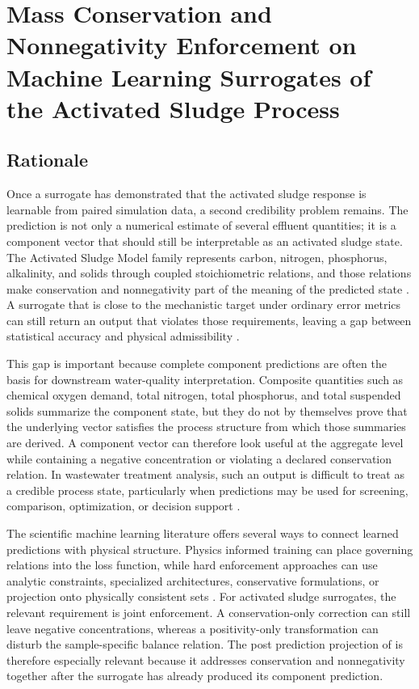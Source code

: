 \documentclass[12pt, twoside]{book}
\begin{document}
\chapter{Mass Conservation and Nonnegativity Enforcement on Machine Learning Surrogates of the Activated Sludge Process}
\label{ch:conservation}

\section{Rationale}

Once a surrogate has demonstrated that the activated sludge response is learnable from paired simulation data,
a second credibility problem remains. The prediction is not only a numerical estimate of several effluent
quantities; it is a component vector that should still be interpretable as an activated sludge state. The
Activated Sludge Model family represents carbon, nitrogen, phosphorus, alkalinity, and solids through coupled
stoichiometric relations, and those relations make conservation and nonnegativity part of the meaning of the
predicted state \citep{Henze2006,Guerrero2011}. A surrogate that is close to the mechanistic target under
ordinary error metrics can still return an output that violates those requirements, leaving a gap between
statistical accuracy and physical admissibility \citep{Hansen2024,KircherVotsmeier2025}.

This gap is important because complete component predictions are often the basis for downstream water-quality
interpretation. Composite quantities such as chemical oxygen demand, total nitrogen, total phosphorus, and
total suspended solids summarize the component state, but they do not by themselves prove that the underlying
vector satisfies the process structure from which those summaries are derived. A component vector can therefore
look useful at the aggregate level while containing a negative concentration or violating a declared
conservation relation. In wastewater treatment analysis, such an output is difficult to treat as a credible
process state, particularly when predictions may be used for screening, comparison, optimization, or decision
support \citep{Araujo2013,BhosekarIerapetritou2018,Durkin2024,Mao2024}.

The scientific machine learning literature offers several ways to connect learned predictions with physical
structure. Physics informed training can place governing relations into the loss function, while hard
enforcement approaches can use analytic constraints, specialized architectures, conservative formulations, or
projection onto physically consistent sets \citep{Raissi2019,Beucler2021,Hansen2024,SturmWexler2020,SturmWexler2022,Valente2025}.
For activated sludge surrogates, the relevant requirement is joint enforcement. A conservation-only correction
can still leave negative concentrations, whereas a positivity-only transformation can disturb the
sample-specific balance relation. The post prediction projection of \citet{KircherVotsmeier2025} is therefore
especially relevant because it addresses conservation and nonnegativity together after the surrogate has
already produced its component prediction.
\end{document}
